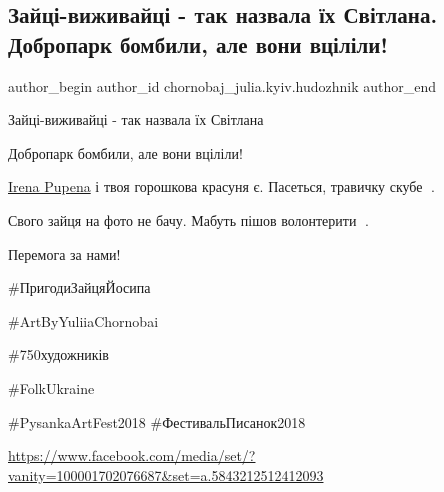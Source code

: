  
 
 
 
 

\subsection{Зайці-виживайці - так назвала їх Світлана. Добропарк бомбили, але вони вціліли!}
\label{sec:27_07_2022.fb.chornobaj_julia.kyiv.hudozhnik.1.zajci_vyzhyvajci_tak_nazvala_ih_svitlana}

\ifcmt
 author_begin
   author_id chornobaj_julia.kyiv.hudozhnik
 author_end
\fi

Зайці-виживайці - так назвала їх Світлана 💙💛

Добропарк бомбили, але вони вціліли!

\href{https://www.facebook.com/vojcovich}{Irena Pupena} і твоя горошкова
красуня є. Пасеться, травичку скубе 🤣.

Свого зайця на фото не бачу. Мабуть пішов волонтерити 🐰. 

Перемога за нами!

\#ПригодиЗайцяЙосипа

\#ArtByYuliiaChornobai

\#750художників

\#FolkUkraine 

\#PysankaArtFest2018 \#ФестивальПисанок2018

\url{https://www.facebook.com/media/set/?vanity=100001702076687&set=a.5843212512412093}
